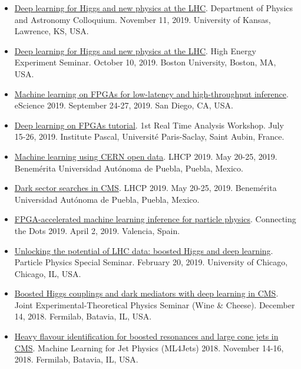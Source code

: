 \documentclass[11pt]{res}
\begin{document}
\begin{resume}
\begin{itemize}
    \item \href{https://physics.drupal.ku.edu/calendar/colloquia#/?i=2}{Deep learning for Higgs and new physics at the LHC}. Department of Physics and Astronomy Colloquium. November 11, 2019. University of Kansas, Lawrence, KS, USA.
    \item \href{http://physics.bu.edu/events/show/2204}{Deep learning for Higgs and new physics at the LHC}. High Energy Experiment Seminar. October 10, 2019. Boston University, Boston, MA, USA.
    \item \href{https://escience2019.sdsc.edu/program}{Machine learning on FPGAs for low-latency and high-throughput inference}. eScience 2019. September 24-27, 2019. San Diego, CA, USA.
    \item \href{https://indico.cern.ch/event/793125/contributions/3495251/}{Deep learning on FPGAs tutorial}. 1st Real Time Analysis Workshop. July 15-26, 2019. Institute Pascal, Universit\'{e} Paris-Saclay, Saint Aubin, France.
    \item \href{https://indico.cern.ch/event/687651/contributions/3428206/}{Machine learning using CERN open data}. LHCP 2019. May 20-25, 2019. Benem\'{e}rita Universidad Aut\'{o}noma de Puebla, Puebla, Mexico.
    \item \href{https://indico.cern.ch/event/687651/contributions/3426898/}{Dark sector searches in CMS}. LHCP 2019. May 20-25, 2019. Benem\'{e}rita Universidad Aut\'{o}noma de Puebla, Puebla, Mexico.
    \item \href{https://indico.cern.ch/event/742793/contributions/3274392/}{FPGA-accelerated machine learning inference for particle physics}. Connecting the Dots 2019. April 2, 2019. Valencia, Spain.
    \item \href{https://universityofchicago.hosted.panopto.com/Panopto/Pages/Viewer.aspx?id=66ca09d7-74c1-4b12-bb57-a9fa01046cdf}{Unlocking the potential of LHC data: boosted Higgs and deep learning}. Particle Physics Special Seminar. February 20, 2019. University of Chicago, Chicago, IL, USA.
    \item \href{http://theory.fnal.gov/events/event/results-from-cms-18/}{Boosted Higgs couplings and dark mediators with deep learning in CMS}. Joint Experimental-Theoretical Physics Seminar (Wine \& Cheese). December 14, 2018. Fermilab, Batavia, IL, USA.
    \item \href{https://indico.cern.ch/event/745718/contributions/3211982/}{Heavy flavour identification for boosted resonances and large cone jets in CMS}. Machine Learning for Jet Physics (ML4Jets) 2018. November 14-16, 2018. Fermilab, Batavia, IL, USA.

\end{itemize}
\end{resume}
\end{document}
